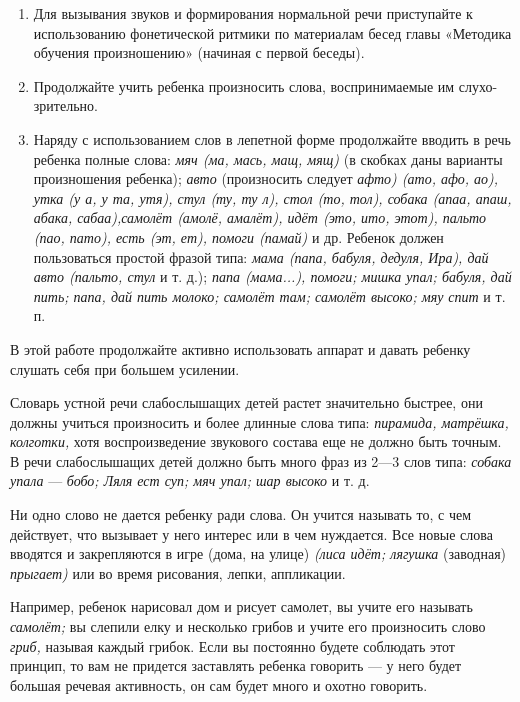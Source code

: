 \documentclass{book}
\renewcommand{\emph}[1]{\textit{#1}}
\begin{document}
\begin{enumerate}
\def\labelenumi{\arabic{enumi}.}
\item
  
  Для вызывания звуков и формирования нормальной речи приступайте к
  использованию фонетической ритмики по материалам бесед главы «Методика
  обучения произношению» (начиная с первой беседы).
  
\item
  
  Продолжайте учить ребенка произносить слова, воспринимаемые им
  слухо-зрительно.
  
\item
  
  Наряду с использованием слов в лепетной форме продолжайте вводить в
  речь ребенка полные слова: \emph{мяч (ма, мась, мащ, мящ)} (в скобках
  даны варианты произношения ребенка); \emph{авто} (произносить следует
  \emph{афто) (ато, афо, ао), утка (у а, у та, утя), стул (ту, ту л),
  стол (то, тол), собака (апаа, апаш, абака, сабаа),самолёт (амолё,
  амалёт), идёт (это, ито, этот), пальто (пао, пато), есть (эт, ет),
  помоги (памай)} и др. Ребенок должен пользоваться простой фразой типа:
  \emph{мама (папа, бабуля, дедуля, Ира), дай авто (пальто, стул} и т.
  д.); \emph{папа (мама...), помоги; мишка упал; бабуля, дай пить; папа,
  дай пить молоко; самолёт там; самолёт высоко; мяу спит} и т. п.
  
\end{enumerate}


В этой работе продолжайте активно использовать аппарат и давать ребенку
слушать себя при большем усилении.

Словарь устной речи слабослышащих детей растет значительно быстрее, они
должны учиться произносить и более длинные слова типа: \emph{пирамида,
матрёшка, колготки,} хотя воспроизведение звукового состава еще не
должно быть точным. В речи слабослышащих детей должно быть много фраз из
2---3 слов типа: \emph{собака упала} --- \emph{бобо; Ляля ест суп; мяч
упал; шар высоко} и т. д.

Ни одно слово не дается ребенку ради слова. Он учится называть то, с чем
действует, что вызывает у него интерес или в чем нуждается. Все новые
слова вводятся и закрепляются в игре (дома, на улице) \emph{(лиса идёт;
лягушка} (заводная) \emph{прыгает)} или во время рисования, лепки,
аппликации.

Например, ребенок нарисовал дом и рисует самолет, вы учите его называть
\emph{самолёт;} вы слепили елку и несколько грибов и учите его
произносить слово \emph{гриб,} называя каждый грибок. Если вы постоянно
будете соблюдать этот принцип, то вам не придется заставлять ребенка
говорить --- у него будет большая речевая активность, он сам будет много
и охотно говорить.
\end{document}
